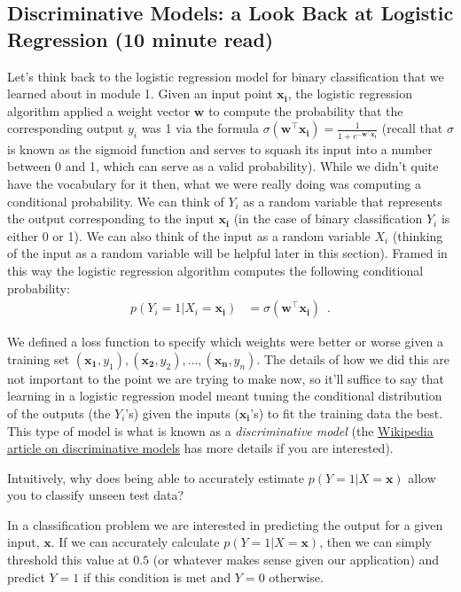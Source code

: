 \documentclass[assignment03_Solutions]{subfiles}
\begin{document}
\subsection{Discriminative Models: a Look Back at Logistic Regression (10 minute read)}

Let's think back to the logistic regression model for binary classification that we learned about in module 1.  Given an input point $\mathbf{x_i}$, the logistic regression algorithm applied a weight vector $\mathbf{w}$ to compute the probability that the corresponding output $y_i$ was 1 via the formula $\sigma(\mathbf{w}^\top \mathbf{x_i}) = \frac{1}{1+e^{-\mathbf{w}^\top \mathbf{x_i}}}$ (recall that $\sigma$ is known as the sigmoid function and serves to squash its input into a number between 0 and 1, which can serve as a valid probability).  While we didn't quite have the vocabulary for it then, what we were really doing was computing a conditional probability.  We can think of $Y_i$ as a random variable that represents the output corresponding to the input $\mathbf{x_i}$ (in the case of binary classification $Y_i$ is either 0 or 1).  We can also think of the input as a random variable $X_i$ (thinking of the input as a random variable will be helpful later in this section).  Framed in this way the logistic regression algorithm computes the following conditional probability:
\begin{align}
p(Y_i = 1 | X_i = \mathbf{x_i}) &= \sigma(\mathbf{w}^\top \mathbf{x_i}) \enspace .
\end{align}

We defined a loss function to specify which weights were better or worse given a training set $(\mathbf{x_1}, y_1), (\mathbf{x_2}, y_2), \ldots, (\mathbf{x_n}, y_n)$.  The details of how we did this are not important to the point we are trying to make now, so it'll suffice to say that learning in a logistic regression model meant tuning the conditional distribution of the outputs (the $Y_i$'s) given the inputs ($\mathbf{x_i}$'s) to fit the training data the best.  This type of model is what is known as a \emph{discriminative model} (the \href{https://en.wikipedia.org/wiki/Discriminative_model}{Wikipedia article on discriminative models} has more details if you are interested).

\vspace{1em}

\begin{understandingcheck}
Intuitively, why does being able to accurately estimate $p(Y = 1 | X = \mathbf{x})$ allow you to classify unseen test data?

\begin{boxedsolution}
In a classification problem we are interested in predicting the output for a given input, $\mathbf{x}$.  If we can accurately calculate $p(Y=1|X = \mathbf{x})$, then we can simply threshold this value at $0.5$ (or whatever makes sense given our application) and predict $Y = 1$ if this condition is met and $Y = 0$ otherwise.
\end{boxedsolution}
\end{understandingcheck}
\end{document}

